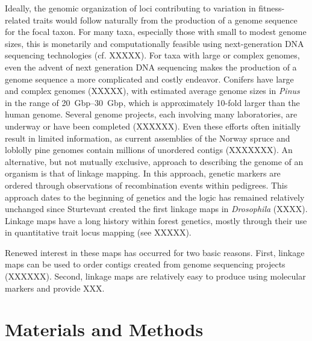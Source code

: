 \documentclass[11pt]{article}
\begin{document}
Ideally, the genomic organization of loci contributing to variation in fitness-related traits would follow naturally
from the production of a genome sequence for the focal taxon. For many taxa, especially those with small to modest genome sizes,
this is monetarily and computationally feasible using next-generation DNA sequencing technologies (cf. XXXXX). For taxa with large or complex
genomes, even the advent of next generation DNA sequencing makes the production of a genome sequence a more complicated
and costly endeavor. Conifers have large and complex genomes (XXXXX), with estimated average genome sizes in \textit{Pinus} in the range of \SIrange{20}{30}{Gbp},
which is approximately 10-fold larger than the human genome. Several genome projects, each involving many laboratories, are
underway or have been completed (XXXXXX). Even these efforts often initially result in limited information, as current assemblies of the Norway spruce and
loblolly pine genomes contain millions of unordered contigs (XXXXXXX). An alternative, but not mutually exclusive, approach to describing the genome of an
organism is that of linkage mapping. In this approach, genetic markers are ordered through observations of recombination events within pedigrees. This approach
dates to the beginning of genetics and the logic has remained relatively unchanged since Sturtevant created the first 
linkage maps in \textit{Drosophila} (XXXX). Linkage maps have a long history within forest genetics, mostly through their use in quantitative trait locus
mapping (see XXXXX). 

Renewed interest in these maps has occurred for two basic reasons. First, linkage maps can be used to order contigs created
from genome sequencing projects (XXXXXX). Second,  linkage maps are relatively easy to produce using molecular markers and provide 
XXX.


\section{Materials and Methods}
\end{document}
